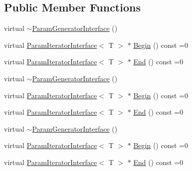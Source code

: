 \subsection*{Public Member Functions}
\begin{DoxyCompactItemize}
\item 
virtual \mbox{\hyperlink{classtesting_1_1internal_1_1_param_generator_interface_ac2767cb9ad2e292e291c4903323c6eff}{$\sim$\+Param\+Generator\+Interface}} ()
\item 
virtual \mbox{\hyperlink{classtesting_1_1internal_1_1_param_iterator_interface}{Param\+Iterator\+Interface}}$<$ T $>$ $\ast$ \mbox{\hyperlink{classtesting_1_1internal_1_1_param_generator_interface_ae1de83b16fe9a53c67778a026c6a9569}{Begin}} () const =0
\item 
virtual \mbox{\hyperlink{classtesting_1_1internal_1_1_param_iterator_interface}{Param\+Iterator\+Interface}}$<$ T $>$ $\ast$ \mbox{\hyperlink{classtesting_1_1internal_1_1_param_generator_interface_afa7211b74990e11d3fc7ad4e7113da4f}{End}} () const =0
\item 
virtual \mbox{\hyperlink{classtesting_1_1internal_1_1_param_generator_interface_ac2767cb9ad2e292e291c4903323c6eff}{$\sim$\+Param\+Generator\+Interface}} ()
\item 
virtual \mbox{\hyperlink{classtesting_1_1internal_1_1_param_iterator_interface}{Param\+Iterator\+Interface}}$<$ T $>$ $\ast$ \mbox{\hyperlink{classtesting_1_1internal_1_1_param_generator_interface_ae1de83b16fe9a53c67778a026c6a9569}{Begin}} () const =0
\item 
virtual \mbox{\hyperlink{classtesting_1_1internal_1_1_param_iterator_interface}{Param\+Iterator\+Interface}}$<$ T $>$ $\ast$ \mbox{\hyperlink{classtesting_1_1internal_1_1_param_generator_interface_afa7211b74990e11d3fc7ad4e7113da4f}{End}} () const =0
\item 
virtual \mbox{\hyperlink{classtesting_1_1internal_1_1_param_generator_interface_ac2767cb9ad2e292e291c4903323c6eff}{$\sim$\+Param\+Generator\+Interface}} ()
\item 
virtual \mbox{\hyperlink{classtesting_1_1internal_1_1_param_iterator_interface}{Param\+Iterator\+Interface}}$<$ T $>$ $\ast$ \mbox{\hyperlink{classtesting_1_1internal_1_1_param_generator_interface_ae1de83b16fe9a53c67778a026c6a9569}{Begin}} () const =0
\item 
virtual \mbox{\hyperlink{classtesting_1_1internal_1_1_param_iterator_interface}{Param\+Iterator\+Interface}}$<$ T $>$ $\ast$ \mbox{\hyperlink{classtesting_1_1internal_1_1_param_generator_interface_afa7211b74990e11d3fc7ad4e7113da4f}{End}} () const =0
\end{DoxyCompactItemize}


